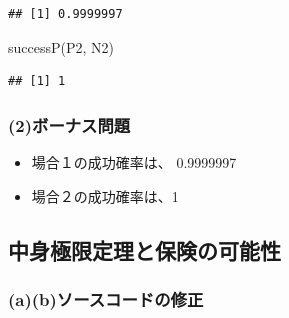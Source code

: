 \documentclass[
]{article}
\newenvironment{Shaded}{\begin{snugshade}}{\end{snugshade}}
\newcommand{\ControlFlowTok}[1]{\textcolor[rgb]{0.13,0.29,0.53}{\textbf{#1}}}
\newcommand{\DocumentationTok}[1]{\textcolor[rgb]{0.56,0.35,0.01}{\textbf{\textit{#1}}}}
\newcommand{\FunctionTok}[1]{\textcolor[rgb]{0.00,0.00,0.00}{#1}}
\newcommand{\NormalTok}[1]{#1}
\newcommand{\OtherTok}[1]{\textcolor[rgb]{0.56,0.35,0.01}{#1}}
\newcommand{\SpecialCharTok}[1]{\textcolor[rgb]{0.00,0.00,0.00}{#1}}
\providecommand{\tightlist}{%
  \setlength{\itemsep}{0pt}\setlength{\parskip}{0pt}}
\begin{document}
\begin{verbatim}
## [1] 0.9999997
\end{verbatim}

\begin{Shaded}
\begin{Highlighting}[]
\FunctionTok{successP}\NormalTok{(P2, N2)}
\end{Highlighting}
\end{Shaded}

\begin{verbatim}
## [1] 1
\end{verbatim}

\hypertarget{ux30dcux30fcux30caux30b9ux554fux984c}{%
\subsubsection{(2)ボーナス問題}\label{ux30dcux30fcux30caux30b9ux554fux984c}}

\begin{itemize}
\tightlist
\item
  場合１の成功確率は、 0.9999997
\item
  場合２の成功確率は、1
\end{itemize}

\hypertarget{ux4e2dux8eabux6975ux9650ux5b9aux7406ux3068ux4fddux967aux306eux53efux80fdux6027}{%
\subsection{中身極限定理と保険の可能性}\label{ux4e2dux8eabux6975ux9650ux5b9aux7406ux3068ux4fddux967aux306eux53efux80fdux6027}}

\hypertarget{abux30bdux30fcux30b9ux30b3ux30fcux30c9ux306eux4feeux6b63}{%
\subsubsection{(a)(b)ソースコードの修正}\label{abux30bdux30fcux30b9ux30b3ux30fcux30c9ux306eux4feeux6b63}}

\begin{Shaded}
\end{Shaded}
\end{document}
